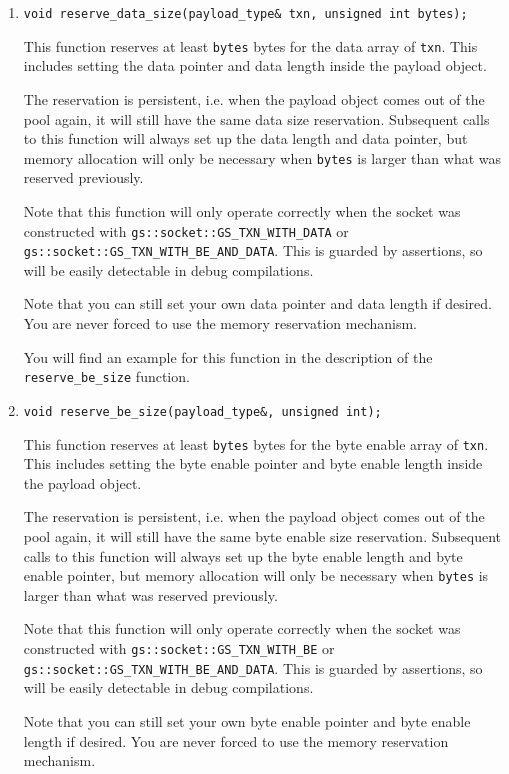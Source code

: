 \documentclass[a4paper,10pt]{article}          %
\begin{document}
\begin{enumerate}
\item 
\verb|void reserve_data_size(payload_type& txn, unsigned int bytes);|

This function reserves at least \verb|bytes| bytes for the data array of \verb|txn|. This includes setting the data pointer and data length inside the payload object.

The reservation is persistent, i.e. when the payload object comes out of the pool again, it will still have the same data size reservation. Subsequent calls to this function will always set up the data length and data pointer, but memory allocation will only be necessary when \verb|bytes| is larger than what was reserved previously.

Note that this function will only operate correctly when the socket was constructed with \linebreak\verb|gs::socket::GS_TXN_WITH_DATA| or \verb|gs::socket::GS_TXN_WITH_BE_AND_DATA|. This is guarded by assertions, so will be easily detectable in debug compilations.

Note that you can still set your own data pointer and data length if desired. You are never forced to use the memory reservation mechanism.

You will find an example for this function in the description of the \verb|reserve_be_size| function.

\item 
\verb|void reserve_be_size(payload_type&, unsigned int);|

This function reserves at least \verb|bytes| bytes for the byte enable array of \verb|txn|. This includes setting the byte enable pointer and byte enable length inside the payload object.

The reservation is persistent, i.e. when the payload object comes out of the pool again, it will still have the same byte enable size reservation. Subsequent calls to this function will always set up the byte enable length and byte enable pointer, but memory allocation will only be necessary when \verb|bytes| is larger than what was reserved previously.

Note that this function will only operate correctly when the socket was constructed with \linebreak\verb|gs::socket::GS_TXN_WITH_BE| or \verb|gs::socket::GS_TXN_WITH_BE_AND_DATA|. This is guarded by assertions, so will be easily detectable in debug compilations.

Note that you can still set your own byte enable pointer and byte enable length if desired. You are never forced to use the memory reservation mechanism.


\end{enumerate}
\end{document}
